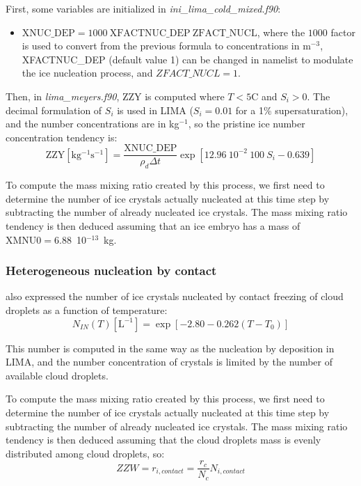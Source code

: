 First, some variables are initialized in \emph{ini\_lima\_cold\_mixed.f90}:
\begin{itemize}
 \item $\mathrm{XNUC\_DEP} = 1000 ~ \mathrm{XFACTNUC\_DEP} ~ \mathrm{ZFACT\_NUCL}$, where the $1000$ factor is used to convert from the previous formula to concentrations in m$^{-3}$, XFACTNUC\_DEP (default value 1) can be changed in namelist to modulate the ice nucleation process, and $ZFACT\_NUCL = 1$.
\end{itemize}

Then, in \emph{lima\_meyers.f90}, ZZY is computed where $T<5$\textdegree C and $S_i > 0$. The decimal formulation of $S_i$ is used in LIMA ($S_i = 0.01$ for a 1\% supersaturation), and the number concentrations are in kg$^{-1}$, so the pristine ice number concentration tendency is:
\begin{equation}
 \mathrm{ZZY [kg^{-1}s^{-1}]}= \frac{\mathrm{XNUC\_DEP}}{\rho_d \Delta t} \exp[12.96~10^{-2} ~ 100 ~ S_i - 0.639]
\end{equation}

To compute the mass mixing ratio created by this process, we first need to determine the number of ice crystals actually nucleated at this time step by subtracting the number of already nucleated ice crystals. The mass mixing ratio tendency is then deduced assuming that an ice embryo has a mass of $\mathrm{XMNU0} = 6.88$~10$^{-13}$~kg.

\subsubsection{Heterogeneous nucleation by contact}

\citet[][Eq.\ (2.6)]{Meyers1992} also expressed the number of ice crystals nucleated by contact freezing of cloud droplets as a function of temperature:
\begin{equation}
 N_{IN}(T) \mathrm{[L^{-1}]} = \exp[-2.80 - 0.262 (T-T_0)]
\end{equation}

This number is computed in the same way as the nucleation by deposition in LIMA, and the number concentration of crystals is limited by the number of available cloud droplets.

To compute the mass mixing ratio created by this process, we first need to determine the number of ice crystals actually nucleated at this time step by subtracting the number of already nucleated ice crystals. The mass mixing ratio tendency is then deduced assuming that the cloud droplets mass is evenly distributed among cloud droplets, so:
\begin{equation}
 ZZW = r_{i,contact} = \frac{r_c}{N_c} N_{i,contact}
\end{equation}

